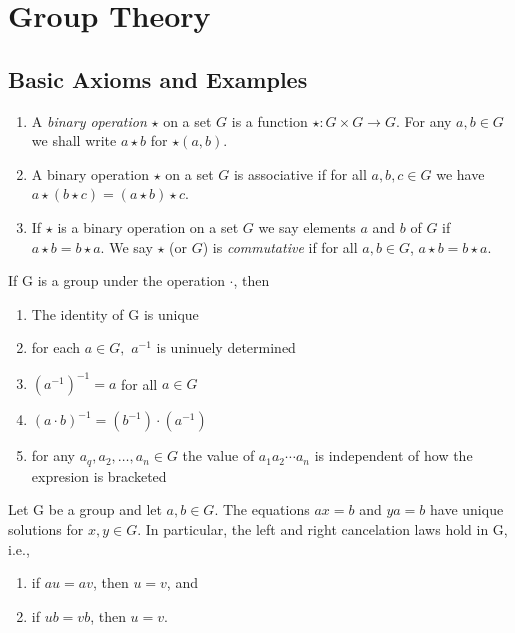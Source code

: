 \documentclass[../main]{subfiles}
\begin{document}
 
 \section{Group Theory}
 
 \subsection{Basic Axioms and Examples}
 
 
 \begin{dfn}
  \begin{enumerate}
   \item A \textit{binary operation} $\star$ on a set $G$ is a function $\star \colon G\times G \to G$. For any $a,b\in G$ we shall write $a\star b$ for $\star (a,b)$.
   \item A binary operation $\star$ on a set $G$ is associative if for all $a,b,c\in G$ we have $a\star (b\star c)=(a\star b)\star c$.
   \item If $\star$ is a binary operation on a set $G$ we say elements $a$ and $b$ of $G$  if $a\star b = b\star a$. We say $\star$ (or $G$) is \textit{commutative} if for all $a,b\in G$, $a\star b = b\star a$.
  \end{enumerate}
 \end{dfn}
 
 \begin{prop}
  If G is a group under the operation $\cdot$, then
  \begin{enumerate}
   \item The identity of G is unique 
   \item for each $a \in G,$ $a^{-1}$ is uninuely determined
   \item $(a^{-1})^{-1} = a$ for all $a \in G$
   \item $(a\cdot b)^{-1}=(b^{-1})\cdot(a^{-1})$
   \item for any $a_q,a_2, \ldots,a_n\in G$ the value of $a_1 a_2 \cdots a_n$ is independent of how the expresion is bracketed 
  \end{enumerate}
 \end{prop}

 \begin{prop}
  Let G be a group and let $a,b\in G$. The equations $ax=b$ and $ya=b$ have unique solutions for $x,y \in G$. In particular, the left and right cancelation laws hold in G, i.e.,
  \begin{enumerate}
   \item if $au=av$, then $u=v$, and 
   \item if $ub=vb$, then $u=v$.
  \end{enumerate}
 \end{prop}
\end{document}
